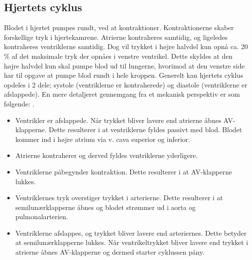 \subsection{Hjertets cyklus}
Blodet i hjertet pumpes rundt, ved at kontraktioner. Kontraktionerne skaber forskellige tryk i hjertekamrene. Atrierne kontraheres samtidig, og ligeledes kontraheres ventriklerne samtidig. Dog vil trykket i højre halvdel kun opnå ca. 20 \% af det maksimale tryk der opnåes i venstre ventrikel. Dette skyldes at den højre halvdel kun skal pumpe blod ud til lungerne, hvorimod at den venstre side har til opgave at pumpe blod rundt i hele kroppen. Generelt kan hjertets cyklus opdeles i 2 dele; systole (ventriklerne er kontraherede)  og diastole (ventriklerne er afslappede). En mere detaljeret gennemgang fra et mekanisk perspektiv er som følgende: \cite{gronanatomi}.


\begin{itemize}
\item Ventrikler er afslappede. Når trykket bliver lavere end atrierne åbnes AV-klapperne. Dette resulterer i at ventriklerne fyldes passivt med blod. Blodet kommer ind i højre atrium via v. cava superior og inferior.
\item Atrierne kontraherer og derved fyldes ventriklerne yderligere.
\item Ventriklerne påbegynder kontraktion. Dette resulterer i at AV-klapperne lukkes.
\item Ventriklernes tryk overstiger trykket i arterierne. Dette resulterer i at semilunærklapperne åbnes og blodet strømmer ud i aorta og pulmonalarterien.
\item Ventriklerne afslappes, og trykket bliver lavere end arteriernes. Dette betyder at semilunærklapperne lukkes. Når ventrikeltrykket bliver lavere end trykket i atrierne åbnes AV-klapperne og dermed starter cyklussen påny.
\end{itemize}


